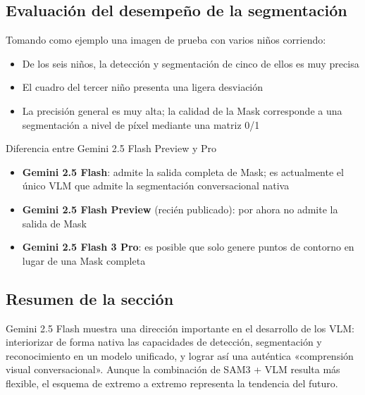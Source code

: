 \subsection{Evaluación del desempeño de la segmentación}

Tomando como ejemplo una imagen de prueba con varios niños corriendo:
\begin{itemize}
    \item De los seis niños, la detección y segmentación de cinco de ellos es muy precisa
    \item El cuadro del tercer niño presenta una ligera desviación
    \item La precisión general es muy alta; la calidad de la Mask corresponde a una segmentación a nivel de píxel mediante una matriz 0/1
\end{itemize}

\begin{knowledgebox}{Diferencia entre Gemini 2.5 Flash Preview y Pro}
\begin{itemize}
    \item \textbf{Gemini 2.5 Flash}: admite la salida completa de Mask; es actualmente el único VLM que admite la segmentación conversacional nativa
    \item \textbf{Gemini 2.5 Flash Preview} (recién publicado): por ahora no admite la salida de Mask
    \item \textbf{Gemini 2.5 Flash 3 Pro}: es posible que solo genere puntos de contorno en lugar de una Mask completa
\end{itemize}
\end{knowledgebox}

\subsection{Resumen de la sección}

Gemini 2.5 Flash muestra una dirección importante en el desarrollo de los VLM: interiorizar de forma nativa las capacidades de detección, segmentación y reconocimiento en un modelo unificado, y lograr así una auténtica «comprensión visual conversacional». Aunque la combinación de SAM3 + VLM resulta más flexible, el esquema de extremo a extremo representa la tendencia del futuro.


